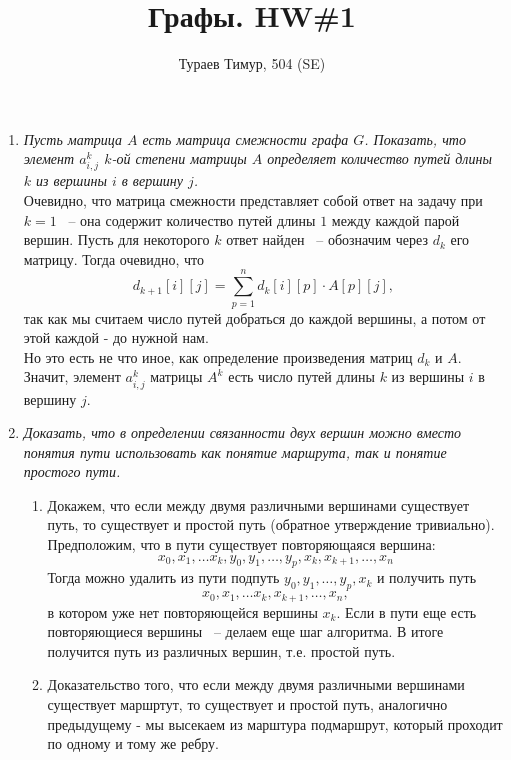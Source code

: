 \documentclass[10pt,a4paper]{article}
\begin{document}
\title{Графы. HW\#1}
\author{Тураев Тимур, 504 (SE)}
\maketitle

\begin{enumerate}
	\renewcommand\labelenumi{\bfseries\theenumi}
	\item \textit{Пусть матрица $A$ есть матрица смежности графа $G$. Показать, что элемент $a_{i,j}^k$ $k$-ой степени матрицы $A$ определяет количество путей длины $k$ из вершины $i$  в вершину $j$.}\\
	Очевидно, что матрица смежности представляет собой ответ на задачу при $k=1$ ~-- она содержит количество путей длины $1$ между каждой парой вершин. Пусть для некоторого $k$ ответ найден ~-- обозначим через $d_k$ его матрицу. Тогда очевидно, что
	\[
	d_{k+1}[i][j]=\sum\limits_{p=1}^n d_k[i][p] \cdot A[p][j],
	\]так как мы считаем число путей добраться до каждой вершины, а потом от этой каждой - до нужной нам.\\
	Но это есть не что иное, как определение произведения матриц $d_k$ и $A$. Значит, элемент $a_{i,j}^k$ матрицы $A^k$ есть число путей длины $k$ из вершины $i$ в вершину $j$.	
	\item \textit{Доказать, что в определении связанности двух вершин можно вместо понятия пути использовать как понятие маршрута, так и понятие простого пути.}
	
	\begin{enumerate}
	\item Докажем, что если между двумя различными вершинами существует путь, то существует и простой путь (обратное утверждение тривиально).
	Предположим, что в пути существует повторяющаяся вершина:
	\[ x_0,x_1,\ldots x_k,y_0,y_1,\ldots,y_p,x_k,x_{k+1},\ldots,x_n\]
	Тогда можно удалить из пути подпуть $y_0,y_1,\ldots,y_p,x_k$ и получить путь
	\[ x_0,x_1,\ldots x_k,x_{k+1},\ldots,x_n,\] в котором уже нет повторяющейся вершины $x_k$. Если в пути еще есть повторяющиеся вершины ~-- делаем еще шаг алгоритма. В итоге получится путь из различных вершин, т.е. простой путь.
	\item Доказательство того, что если между двумя различными вершинами существует маршртут, то существует и простой путь, аналогично предыдущему - мы высекаем из марштура подмаршрут, который проходит по одному и тому же ребру.
	\end{enumerate}		
	

\end{enumerate}
\end{document}
